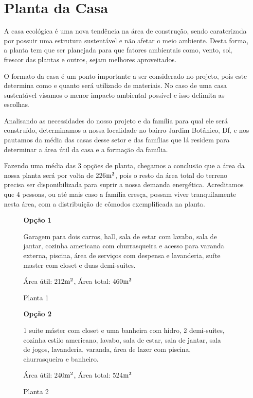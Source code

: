 \section{Planta da Casa}
	
	A casa ecológica é uma nova tendência na área de construção, sendo caraterizada por possuir uma estrutura sustentável e não afetar o meio ambiente. Desta forma, a planta tem que ser planejada para que fatores ambientais como, vento, sol, frescor das plantas e outros, sejam melhores aproveitados. 

	O formato da casa é um ponto importante a ser considerado no projeto, pois este determina como e quanto será utilizado de materiais. No caso de uma casa sustentável visamos o menor impacto ambiental possível e isso delimita as escolhas.

	Analisando as necessidades do nosso projeto e da família para qual ele será construído, determinamos a nossa localidade no bairro Jardim Botânico, Df, e nos pautamos da média das casas desse setor e das famílias que lá residem para determinar a área útil da casa e a formação da família.

	Fazendo uma média das 3 opções de planta, chegamos a conclusão que a área da nossa planta será por volta de 226$\textup{m}^{2}$, pois o resto da área total do terreno precisa ser disponibilizada para suprir a nossa demanda energética. Acreditamos que 4 pessoas, ou até mais caso a família cresça, possam viver tranquilamente nesta área, com a distribuição de cômodos exemplificada na planta. 

\begin{figure}
\textbf{Opção 1}

	Garagem para dois carros, hall, sala de estar com lavabo, sala de jantar, cozinha americana com churrasqueira e acesso para varanda externa, piscina, área de serviços com despensa e lavanderia, suíte master com closet e duas demi-suites. 

Área útil: 212$\textup{m}^{2}$, Área total: 460$\textup{m}^{2}$
\centering
\caption{Planta 1\cite{planta1}}

\end{figure}

\begin{figure}
\textbf{Opção 2}

	1 suite máster com closet e uma banheira com hidro, 2 demi-suítes, cozinha estilo americano, lavabo, sala de estar, sala de jantar, sala de jogos, lavanderia, varanda, área de lazer com piscina, churrasqueira e banheiro.

Área útil: 240$\textup{m}^{2}$, Área total: 524$\textup{m}^{2}$
\centering
\caption{Planta 2\cite{planta2}}

\end{figure}

